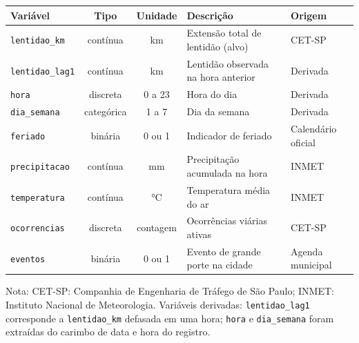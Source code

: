 \begin{quadros}[H]
  \centering
  \caption{Dicionário de variáveis da base horária}
  \label{qua:variaveis}
  \small
  \singlespacing
  \setlength{\tabcolsep}{4pt}
  \renewcommand{\arraystretch}{1.3}
  \begin{tabular}{|l|c|c|l|l|}
    \hline
    \textbf{Variável} & \textbf{Tipo} & \textbf{Unidade} & \textbf{Descrição} & \textbf{Origem} \\ \hline
    \texttt{lentidao\_km}   & contínua   & km       & Extensão total de lentidão (alvo)    & CET-SP \\ \hline
    \texttt{lentidao\_lag1} & contínua   & km       & Lentidão observada na hora anterior  & Derivada \\ \hline
    \texttt{hora}           & discreta   & 0 a 23   & Hora do dia                          & Derivada \\ \hline
    \texttt{dia\_semana}    & categórica & 1 a 7    & Dia da semana                        & Derivada \\ \hline
    \texttt{feriado}        & binária    & 0 ou 1   & Indicador de feriado                 & Calendário oficial \\ \hline
    \texttt{precipitacao}   & contínua   & mm       & Precipitação acumulada na hora       & INMET \\ \hline
    \texttt{temperatura}    & contínua   & °C       & Temperatura média do ar              & INMET \\ \hline
    \texttt{ocorrencias}    & discreta   & contagem & Ocorrências viárias ativas           & CET-SP \\ \hline
    \texttt{eventos}        & binária    & 0 ou 1   & Evento de grande porte na cidade     & Agenda municipal \\ \hline
  \end{tabular}

  {\footnotesize\singlespacing Nota: CET-SP: Companhia de Engenharia de Tráfego de São Paulo; INMET: Instituto Nacional de Meteorologia. Variáveis derivadas: \texttt{lentidao\_lag1} corresponde a \texttt{lentidao\_km} defasada em uma hora; \texttt{hora} e \texttt{dia\_semana} foram extraídas do carimbo de data e hora do registro.\par}
\end{quadros}